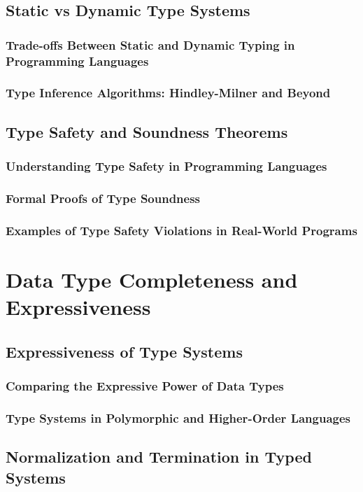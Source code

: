 \documentclass[12pt, oneside]{book}
\begin{document}
\subsection{Static vs Dynamic Type Systems}
\subsubsection{Trade-offs Between Static and Dynamic Typing in Programming Languages}
\subsubsection{Type Inference Algorithms: Hindley-Milner and Beyond}
\subsection{Type Safety and Soundness Theorems}
\subsubsection{Understanding Type Safety in Programming Languages}
\subsubsection{Formal Proofs of Type Soundness}
\subsubsection{Examples of Type Safety Violations in Real-World Programs}

\section{Data Type Completeness and Expressiveness}
\subsection{Expressiveness of Type Systems}
\subsubsection{Comparing the Expressive Power of Data Types}
\subsubsection{Type Systems in Polymorphic and Higher-Order Languages}
\subsection{Normalization and Termination in Typed Systems}
\end{document}
